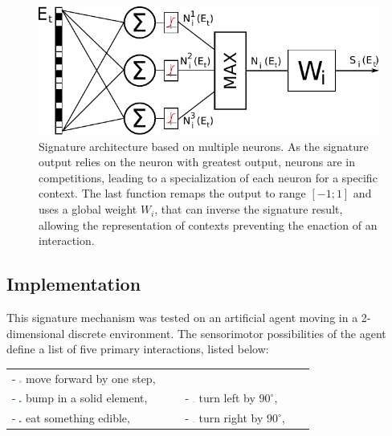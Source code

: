 \documentclass[conference]{IEEEtran}
\begin{document}
\begin{figure}[htbp]
\centerline{\includegraphics[scale=0.6]{img/signature_model2.pdf}}
\caption{Signature architecture based on multiple neurons. As the signature output relies on the neuron with greatest output, neurons are in competitions, leading to a specialization of each neuron for a specific context. The last function remaps the output to range $[-1;1]$ and uses a global weight $W_i$, that can inverse the signature result, allowing the representation of contexts preventing the enaction of an interaction.}
\label{fig}
\end{figure}

\subsection{Implementation}

This signature mechanism was tested on an artificial agent moving in a 2-dimensional discrete environment. The sensorimotor possibilities of the agent define a list of five primary interactions, listed below:

 \begin{tabular}{ l l }
   - \includegraphics[width=0.015\textwidth]{img/mf0.pdf} move forward by one step, \\
   - \includegraphics[width=0.015\textwidth]{img/mf1.pdf} bump in a solid element, &
   - \includegraphics[width=0.02\textwidth]{img/lt0.pdf} turn left by $90^\circ$, \\
   - \includegraphics[width=0.015\textwidth]{img/mf2.pdf} eat something edible, &
   - \includegraphics[width=0.02\textwidth]{img/rt0.pdf} turn right by $90^\circ$, \\
 \end{tabular}
\end{document}
